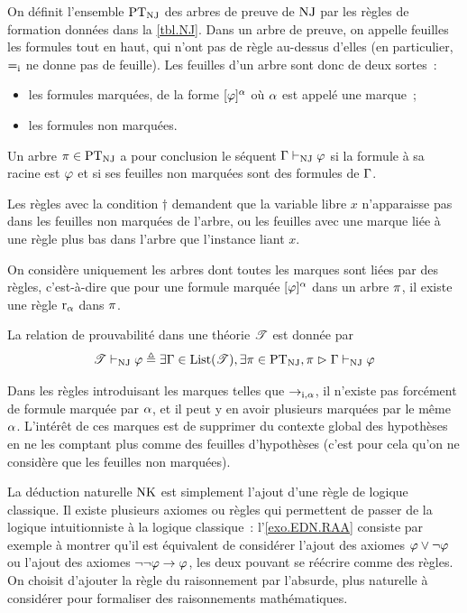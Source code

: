\begin{definition}
  On définit l'ensemble $\ProofNJ$ des arbres de preuve de $\operatorname{NJ}$ par les
  règles de formation données dans la \cref{tbl.NJ}. Dans un arbre de preuve,
  on appelle feuilles les formules tout en haut, qui n'ont pas de règle
  au-dessus d'elles (en particulier, $\mathord{=}_{\mathrm{i}}$ ne donne pas de feuille).
  Les feuilles d'un arbre sont donc de deux sortes~:
  \begin{itemize}
  \item les formules marquées, de la forme $[\varphi]^\alpha$ où $\alpha$
    est appelé une marque~;
  \item les formules non marquées.
  \end{itemize}
  Un arbre $\pi\in \operatorname{PT}_{\operatorname{NJ}}$ a pour conclusion le séquent
  $\Gamma\vdash_{\operatorname{NJ}} \varphi$ si la formule à sa racine est $\varphi$ et si ses
  feuilles non marquées sont des formules de $\Gamma$.

  Les règles avec la condition $\dagger$ demandent que la variable libre $x$
  n'apparaisse pas dans les feuilles non marquées de l'arbre, ou les feuilles
  avec une marque liée à une règle plus bas dans l'arbre que l'instance liant
  $x$.

  On considère uniquement les arbres dont toutes les marques sont liées par
  des règles, c'est-à-dire que pour une formule marquée $[\varphi]^\alpha$
  dans un arbre $\pi$, il existe une règle $\operatorname{r}_\alpha$ dans $\pi$.

  La relation de prouvabilité dans une théorie $\mathscr T$ est donnée par
  \[\mathscr T \vdash_{\operatorname{NJ}} \varphi \triangleq \exists \Gamma \in \operatorname{List}(\mathscr T),
  \exists \pi \in \operatorname{PT}_{\operatorname{NJ}}, \pi\mathrel{\rhd} \Gamma\vdash_{\operatorname{NJ}}\varphi\]
  \index[notation]{$\ProofNJ$}
\end{definition}

\begin{remark}
  Dans les règles introduisant les marques telles que $\mathord{\to}_{\mathrm{i},\alpha}$, il n'existe
  pas forcément de formule marquée par $\alpha$, et il peut y en avoir
  plusieurs marquées par le même $\alpha$. L'intérêt de ces marques est de
  supprimer du contexte global des hypothèses en ne les comptant plus comme des
  feuilles d'hypothèses (c'est pour cela qu'on ne considère que les feuilles non
  marquées).
\end{remark}

La déduction naturelle $\operatorname{NK}$ est simplement l'ajout d'une règle de logique
classique. Il existe plusieurs axiomes ou règles qui permettent de passer de la
logique intuitionniste à la logique classique~: l'\cref{exo.EDN.RAA} consiste
par exemple à montrer qu'il est équivalent de considérer l'ajout des axiomes
$\varphi\lor\lnot\varphi$ ou l'ajout des axiomes $\lnot\lnot\varphi\to\varphi$,
les deux pouvant se réécrire comme des règles. On choisit d'ajouter la règle du
raisonnement par l'absurde, plus naturelle à considérer pour formaliser des
raisonnements mathématiques.

